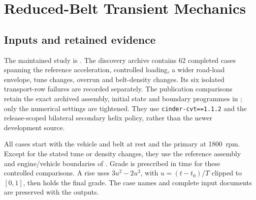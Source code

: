 \documentclass[11pt]{report}
\numberwithin{equation}{section}
\begin{document}
\section{Reduced-Belt Transient Mechanics}
\label{app:study_belt_dynamics}

\subsection{Inputs and retained evidence}

The maintained study is
.
The discovery archive contains 62 completed cases spanning the reference
acceleration, controlled loading, a wider road-load envelope, tune
changes, overrun and belt-density changes. Its six isolated transport-row
failures are recorded separately. The publication comparisons retain the
exact archived assembly, initial state and boundary programmes in
; only the numerical settings are tightened.
They use \texttt{cinder-cvt==1.1.2} and the release-scoped bilateral secondary
helix policy, rather than the newer development source.

All cases start with the vehicle and belt at rest and the primary at
\SI{1800}{rpm}. Except for the stated tune or density changes, they use
the reference assembly and engine/vehicle boundaries of
. Grade is prescribed in time for these
controlled comparisons. A rise uses \(3u^2-2u^3\), with
\(u=(t-t_0)/T\) clipped to \([0,1]\), then holds the final grade.
The case names and complete input documents are preserved with the outputs.
\end{document}
